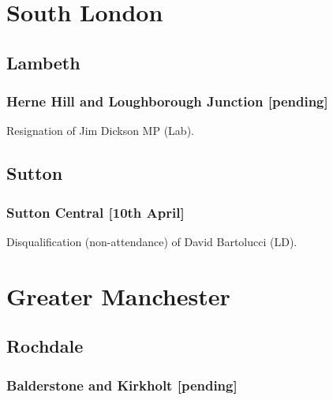 \documentclass[a4paper,openany]{book}
\begin{document}
\begin{resultsiii}
\section{South London}

\subsection*{Lambeth}

\subsubsection*{Herne Hill and Loughborough Junction \hspace*{\fill}\nolinebreak[1]%
	\enspace\hspace*{\fill}
	[pending]}


Resignation of Jim Dickson MP (Lab).

\subsection*{Sutton}

\subsubsection*{Sutton Central \hspace*{\fill}\nolinebreak[1]%
	\enspace\hspace*{\fill}
	[10th April]}


Disqualification (non-attendance) of David Bartolucci (LD).

\section{Greater Manchester}

\subsection*{Rochdale}

\subsubsection*{Balderstone and Kirkholt \hspace*{\fill}\nolinebreak[1]%
	\enspace\hspace*{\fill}
	[pending]}


\end{resultsiii}
\end{document}
